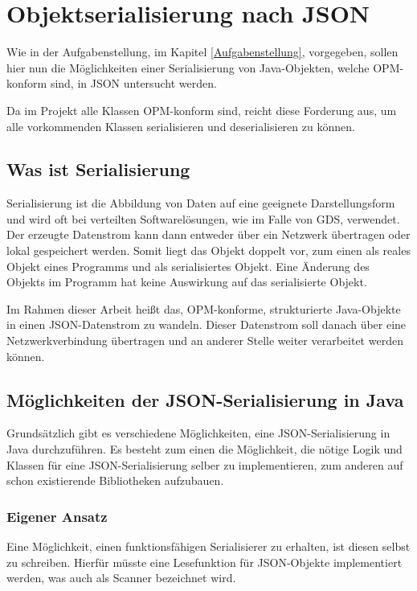 \section{Objektserialisierung nach JSON}
Wie in der Aufgabenstellung, im Kapitel \ref{Aufgabenstellung}, vorgegeben, sollen hier nun die M\"oglichkeiten einer Serialisierung von Java-Objekten, welche \ac{OPM}-konform sind, in \ac{JSON} untersucht werden.

Da im Projekt alle Klassen \ac{OPM}-konform sind, reicht diese Forderung aus, um alle vorkommenden Klassen serialisieren und deserialisieren zu k\"onnen.

\subsection{Was ist Serialisierung}
Serialisierung ist die Abbildung von Daten auf eine geeignete Darstellungsform und wird oft bei verteilten Softwarel\"osungen, wie im Falle von \ac{GDS}, verwendet. Der erzeugte Datenstrom kann dann entweder \"uber ein Netzwerk \"ubertragen oder lokal gespeichert werden. Somit liegt das Objekt doppelt vor, zum einen als reales Objekt eines Programms und als serialisiertes Objekt. Eine \"Anderung des Objekts im Programm hat keine Auswirkung auf das serialisierte Objekt. \cite{WikiSeri}

Im Rahmen dieser Arbeit hei\ss{}t das, \ac{OPM}-konforme, strukturierte Java-Objekte in einen \ac{JSON}-Datenstrom zu wandeln. Dieser Datenstrom soll danach \"uber eine Netzwerkverbindung \"ubertragen und an anderer Stelle weiter verarbeitet werden k\"onnen.

\subsection{M\"oglichkeiten der JSON-Serialisierung in Java}
Grunds\"atzlich gibt es verschiedene M\"oglichkeiten, eine \ac{JSON}-Serialisierung in Java 
durchzuf\"uhren. Es besteht zum einen die M\"oglichkeit, die n\"otige Logik und Klassen f\"ur eine \ac{JSON}-Serialisierung selber zu implementieren, zum anderen auf schon existierende Bibliotheken aufzubauen.


\subsubsection{Eigener Ansatz}
Eine M\"oglichkeit, einen funktionsf\"ahigen Serialisierer zu erhalten, ist diesen selbst zu schreiben. Hierf\"ur m\"usste eine Lesefunktion f\"ur \ac{JSON}-Objekte implementiert werden, was auch als Scanner bezeichnet wird. 

